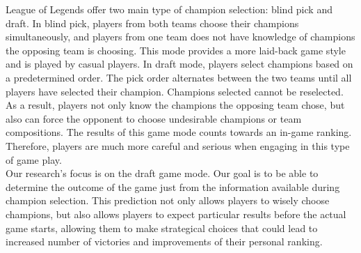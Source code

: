\documentclass{article} %
\begin{document}
League of Legends offer two main type of champion selection: blind pick and draft. In blind pick, players from both teams choose their champions simultaneously, and players from one team does not have knowledge of champions the opposing team is choosing. This mode provides a more laid-back game style and is played by casual players. In draft mode, players select champions based on a predetermined order. The pick order alternates between the two teams until all players have selected their champion. Champions selected cannot be reselected. As a result, players not only know the champions the opposing team chose, but also can force the opponent to choose undesirable champions or team compositions. The results of this game mode counts towards an in-game ranking. Therefore, players are much more careful and serious when engaging in this type of game play.\\
Our research's focus is on the draft game mode. Our goal is to be able to determine the outcome of the game just from the information available during champion selection. This prediction not only allows players to wisely choose champions, but also allows players to expect particular results before the actual game starts, allowing them to make strategical choices that could lead to increased number of victories and improvements of their personal ranking.
\end{document}
